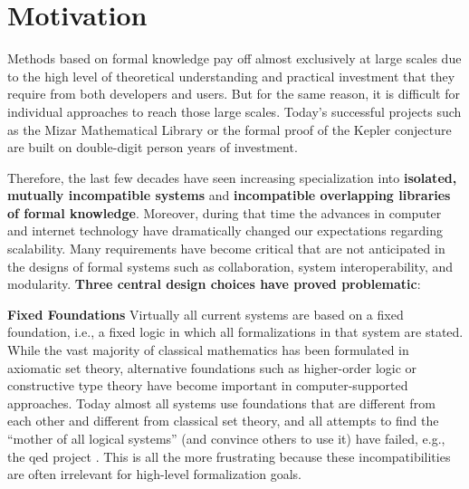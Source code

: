 \section{Motivation}\label{sec:motiv}

Methods based on formal knowledge pay off almost exclusively at large scales due to the high level of theoretical understanding and practical investment that they require from both developers and users.
But for the same reason, it is difficult for individual approaches to reach those large scales.
Today's successful projects such as the Mizar Mathematical Library \cite{mizar}
or the formal proof of the Kepler conjecture \cite{flyspeck}
are built on double-digit person years of investment.

Therefore, the last few decades have seen increasing specialization into \textbf{isolated, mutually incompatible systems} and \textbf{incompatible overlapping libraries of formal knowledge}.
Moreover, during that time the advances in computer and internet technology have dramatically changed our expectations regarding scalability.
Many requirements have become critical that are not anticipated in the designs of formal systems such as collaboration, system interoperability, and modularity.
\textbf{Three central design choices have proved problematic}:

{\bf Fixed Foundations}
Virtually all current systems are based on a fixed foundation, i.e., a fixed logic in which all formalizations in that system are stated.
While the vast majority of classical mathematics has been formulated in axiomatic set theory, alternative foundations such as higher-order logic or constructive type theory have become important in computer-supported approaches.
Today almost all systems use foundations that are different from each other and different from classical set theory, and all attempts to find the ``mother of all logical systems'' (and convince others to use it) have failed, e.g., the qed project \cite{qed}.
This is all the more frustrating because these incompatibilities are often irrelevant for high-level formalization goals.
  
